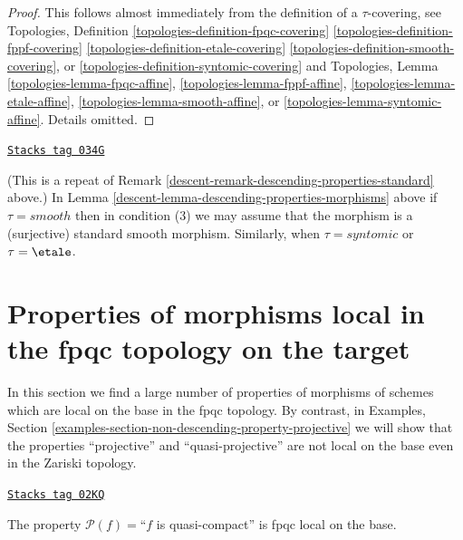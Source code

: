 \begin{proof}
This follows almost immediately from the definition of
a $\tau$-covering, see
Topologies, Definition
\ref{topologies-definition-fpqc-covering}
\ref{topologies-definition-fppf-covering}
\ref{topologies-definition-etale-covering}
\ref{topologies-definition-smooth-covering}, or
\ref{topologies-definition-syntomic-covering}
and Topologies, Lemma
\ref{topologies-lemma-fpqc-affine},
\ref{topologies-lemma-fppf-affine},
\ref{topologies-lemma-etale-affine},
\ref{topologies-lemma-smooth-affine}, or
\ref{topologies-lemma-syntomic-affine}.
Details omitted.
\end{proof}

\begin{remark}
\label{descent-remark-descending-properties-morphisms-standard}
\href{https://stacks.math.columbia.edu/tag/034G}{\texttt{Stacks tag 034G}}

(This is a repeat of Remark \ref{descent-remark-descending-properties-standard} above.)
In Lemma \ref{descent-lemma-descending-properties-morphisms} above if
$\tau = smooth$ then in condition (3) we may assume that
the morphism is a (surjective) standard smooth morphism.
Similarly, when $\tau = syntomic$ or $\tau = \etale$.
\end{remark}

\section{Properties of morphisms local in the fpqc topology on the target}
\label{descent-section-descending-properties-morphisms-fpqc}
In this section we find a large number of properties
of morphisms of schemes which are local on the base
in the fpqc topology. By contrast, in
Examples, Section \ref{examples-section-non-descending-property-projective}
we will show that the properties ``projective'' and ``quasi-projective''
are not local on the base even in the Zariski topology.

\begin{lemma}
\label{descent-lemma-descending-property-quasi-compact}
\href{https://stacks.math.columbia.edu/tag/02KQ}{\texttt{Stacks tag 02KQ}}

The property $\mathcal{P}(f) =$``$f$ is quasi-compact''
is fpqc local on the base.
\end{lemma}

